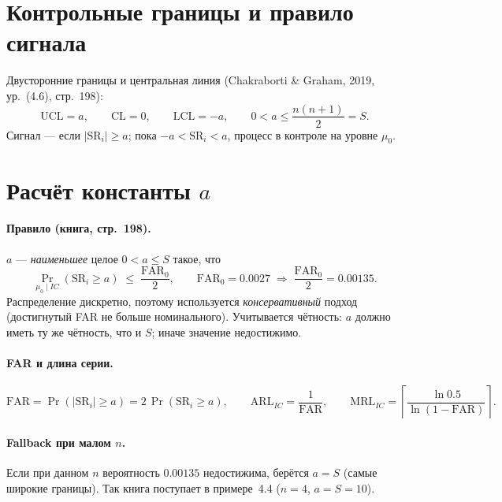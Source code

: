 \documentclass[11pt,a4paper]{article}
\newcommand{\SR}{\mathrm{SR}}
\newcommand{\FAR}{\mathrm{FAR}}
\newcommand{\ARL}{\mathrm{ARL}}
\newcommand{\MRL}{\mathrm{MRL}}
\newcommand{\FARz}{\FAR_0}
\begin{document}
\section{Контрольные границы и правило сигнала}

Двусторонние границы и центральная линия
(Chakraborti \& Graham, 2019, ур.~(4.6), стр.~198):
\begin{equation}
\mathrm{UCL}=a,\qquad \mathrm{CL}=0,\qquad \mathrm{LCL}=-a,
\qquad 0<a\le \frac{n(n+1)}{2}=S .
\label{eq:srlimits}
\end{equation}
Сигнал --- если $|\SR_i|\ge a$; пока $-a<\SR_i<a$, процесс в контроле на
уровне $\mu_0$.

\section{Расчёт константы $a$}

\paragraph{Правило (книга, стр.~198).}
$a$ --- \emph{наименьшее} целое $0<a\le S$ такое, что
\begin{equation}
\Pr_{\mu_0\mid IC}(\SR_i\ge a)\;\le\;\frac{\FARz}{2},
\qquad \FARz=0.0027 \;\Rightarrow\; \frac{\FARz}{2}=0.00135 .
\label{eq:srrule}
\end{equation}
Распределение дискретно, поэтому используется \emph{консервативный}
подход (достигнутый FAR не больше номинального). Учитывается чётность:
$a$ должно иметь ту же чётность, что и $S$; иначе значение недостижимо.

\paragraph{FAR и длина серии.}
\begin{equation}
\FAR=\Pr(|\SR_i|\ge a)=2\,\Pr(\SR_i\ge a),
\qquad
\ARL_{IC}=\frac{1}{\FAR},
\qquad
\MRL_{IC}=\left\lceil\frac{\ln 0.5}{\ln(1-\FAR)}\right\rceil .
\label{eq:srarl}
\end{equation}

\paragraph{Fallback при малом $n$.}
Если при данном $n$ вероятность $0.00135$ недостижима, берётся
$a=S$ (самые широкие границы). Так книга поступает в примере~4.4
($n=4$, $a=S=10$).
\end{document}
